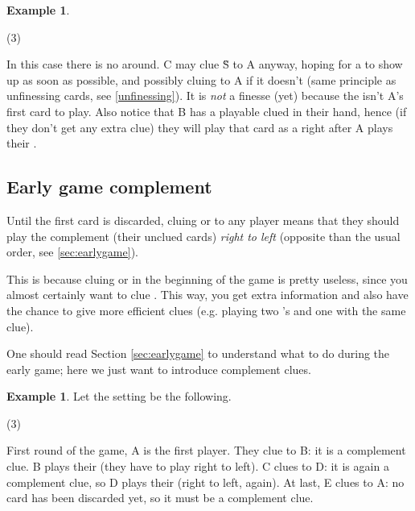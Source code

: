 \documentclass[a4paper]{article}
\theoremstyle{plain}
\theoremstyle{definition}
\newtheorem{example}[theorem]{Example}
\begin{document}
\begin{example}
	\hfill
	\begin{tasks}(3)
		\task[+]      
		\task[A]    
		\task[B]    
		\task[C]    
		\task[D]    
		\task[E]    
	\end{tasks}
	
	In this case there is no  around. C may clue \G{S} to A anyway, hoping for a  to show up as soon as possible, and possibly cluing  to A if it doesn't (same principle as unfinessing cards, see \ref{unfinessing}). It is \textit{not} a finesse (yet) because the  isn't A's first card to play. Also notice that B has a playable clued  in their hand, hence (if they don't get any extra clue) they will play that card as a  right after A plays their .
\end{example}

\subsection{Early game complement}
\label{firstroundcomplement}

Until the first card is discarded, cluing  or  to any player means that they should play the complement (their unclued cards) \textit{right to left} (opposite than the usual order, see \ref{sec:earlygame}).

This is because cluing  or  in the beginning of the game is pretty useless, since you almost certainly want to clue . This way, you get extra information and also have the chance to give more efficient clues (e.g. playing two 's and one  with the same clue).

One should read Section \ref{sec:earlygame} to understand what to do during the early game; here we just want to introduce complement clues.

\begin{example}
	
	Let the setting be the following.
	
	\begin{tasks}(3)
		\task[+]      
		\task[A]    
		\task[B]    
		\task[C]    
		\task[D]    
		\task[E]    
	\end{tasks}
	
	First round of the game, A is the first player. They clue  to B: it is a complement clue. B plays their  (they have to play right to left). C clues  to D: it is again a complement clue, so D plays their  (right to left, again). At last, E clues  to A: no card has been discarded yet, so it must be a complement clue.
\end{example}
\end{document}

